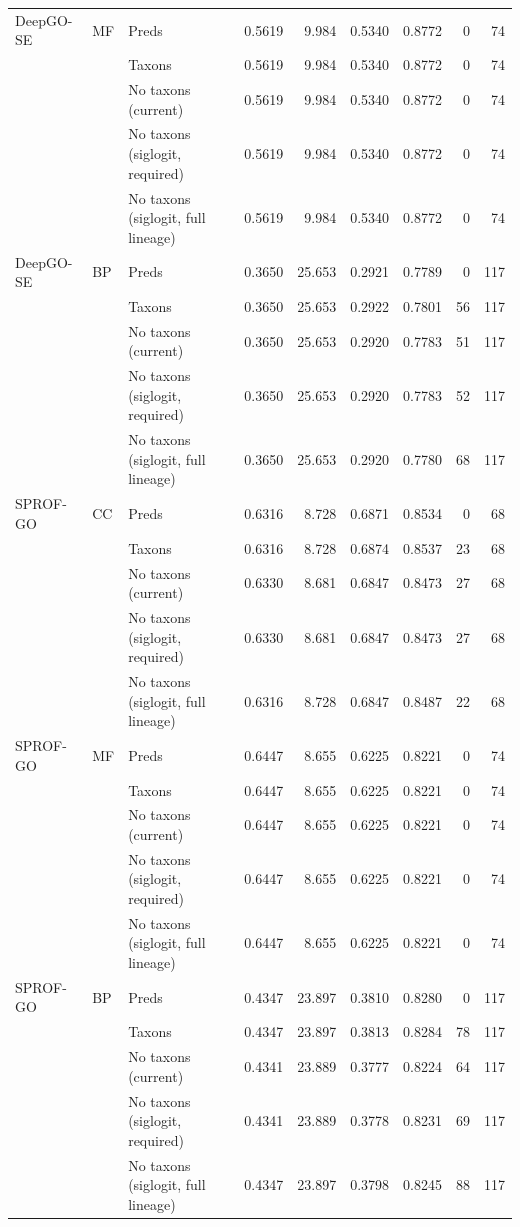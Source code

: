 \begin{tabular}{lllrrrrrr}
\addlinespace
DeepGO-SE & MF & Preds & 0.5619 & 9.984 & 0.5340 & 0.8772 & 0 & 74 \\
 &  & Taxons & 0.5619 & 9.984 & 0.5340 & 0.8772 & 0 & 74 \\
 &  & No taxons (current) & 0.5619 & 9.984 & 0.5340 & 0.8772 & 0 & 74 \\
 &  & No taxons (siglogit, required) & 0.5619 & 9.984 & 0.5340 & 0.8772 & 0 & 74 \\
 &  & No taxons (siglogit, full lineage) & 0.5619 & 9.984 & 0.5340 & 0.8772 & 0 & 74 \\
\addlinespace
DeepGO-SE & BP & Preds & 0.3650 & 25.653 & 0.2921 & 0.7789 & 0 & 117 \\
 &  & Taxons & 0.3650 & 25.653 & 0.2922 & 0.7801 & 56 & 117 \\
 &  & No taxons (current) & 0.3650 & 25.653 & 0.2920 & 0.7783 & 51 & 117 \\
 &  & No taxons (siglogit, required) & 0.3650 & 25.653 & 0.2920 & 0.7783 & 52 & 117 \\
 &  & No taxons (siglogit, full lineage) & 0.3650 & 25.653 & 0.2920 & 0.7780 & 68 & 117 \\
\midrule
SPROF-GO & CC & Preds & 0.6316 & 8.728 & 0.6871 & 0.8534 & 0 & 68 \\
 &  & Taxons & 0.6316 & 8.728 & 0.6874 & 0.8537 & 23 & 68 \\
 &  & No taxons (current) & 0.6330 & 8.681 & 0.6847 & 0.8473 & 27 & 68 \\
 &  & No taxons (siglogit, required) & 0.6330 & 8.681 & 0.6847 & 0.8473 & 27 & 68 \\
 &  & No taxons (siglogit, full lineage) & 0.6316 & 8.728 & 0.6847 & 0.8487 & 22 & 68 \\
\addlinespace
SPROF-GO & MF & Preds & 0.6447 & 8.655 & 0.6225 & 0.8221 & 0 & 74 \\
 &  & Taxons & 0.6447 & 8.655 & 0.6225 & 0.8221 & 0 & 74 \\
 &  & No taxons (current) & 0.6447 & 8.655 & 0.6225 & 0.8221 & 0 & 74 \\
 &  & No taxons (siglogit, required) & 0.6447 & 8.655 & 0.6225 & 0.8221 & 0 & 74 \\
 &  & No taxons (siglogit, full lineage) & 0.6447 & 8.655 & 0.6225 & 0.8221 & 0 & 74 \\
\addlinespace
SPROF-GO & BP & Preds & 0.4347 & 23.897 & 0.3810 & 0.8280 & 0 & 117 \\
 &  & Taxons & 0.4347 & 23.897 & 0.3813 & 0.8284 & 78 & 117 \\
 &  & No taxons (current) & 0.4341 & 23.889 & 0.3777 & 0.8224 & 64 & 117 \\
 &  & No taxons (siglogit, required) & 0.4341 & 23.889 & 0.3778 & 0.8231 & 69 & 117 \\
 &  & No taxons (siglogit, full lineage) & 0.4347 & 23.897 & 0.3798 & 0.8245 & 88 & 117 \\
\bottomrule
\end{tabular}
